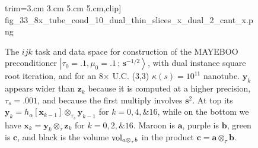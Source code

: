 \documentclass[letterpaper,twocolumn,amsmath,amsfont,amssymb,english,aps,jcp,preprintnumbers,groupaddress,nofootinbib,tightenlines,floatfix]{revtex4}
\newcommand{\mat}[1]{\boldsymbol{#1}}
\newcommand{\ot}{  {\scriptstyle \otimes}_{ \tau } }
\newcommand{\ots}{ {\scriptstyle \otimes}_{ \! \tau_s } }
\theoremstyle{plain}
\theoremstyle{remark}
\theoremstyle{plain}
\begin{document}
\begin{figure}[tb]
{                        trim={3.cm 3.cm 5.cm 5.cm},clip]
                        {fig_33_8x_tube_cond_10_dual_thin_slices_x_dual_2_cant_x.png}} 
\caption{
The $ijk$ task and data space for construction of the MAYEBOO preconditioner 
$\left|\tau_0=.1,\mu_0=.1\, ; \,\scriptstyle{\mat{s}^{-1/2}} \right>$, with 
dual instance square root iteration,  and for an 8$\times$ U.C. (3,3) $\kappa(s)=10^{11}$ nanotube.
$\mat{y}_k$ appears wider than $\mat{z}_k$ because it is computed at a higher precision, $\tau_s=.001$,
and because the first multiply involves $\mat{s}^2$.  At top its  $\mat{y}_k=h_\alpha[ \mat{x}_{k-1} ] \ots \mat{y}_{k-1}$
for $k=0,4,\& 16$, while on the bottom we have $\mat{x}_k=  \mat{y}_{k}  \ot \mat{z}_{k}$ for $k=0,2, \& 16$.
Maroon is $\mat{a}$, purple is $\mat{b}$, green is $\mat{c}$,  and black is the volume ${\rm vol}_{a \ot b}$
in the product $\mat{c}=\mat{a} \ot \mat{b}$.}\label{Lensing1}
\end{figure}
\end{document}
